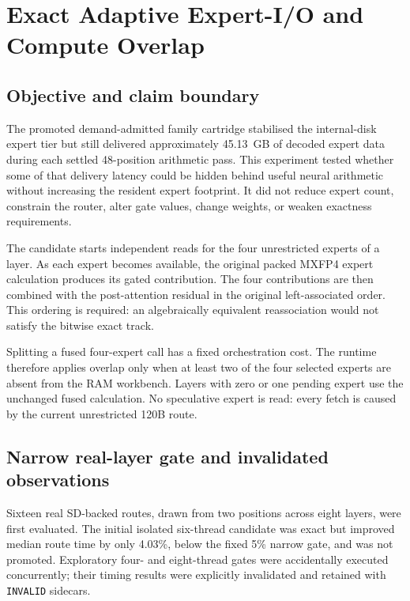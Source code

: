 
\section{Exact Adaptive Expert-I/O and Compute Overlap}
\label{sec:gptoss120b-exact-io-compute-overlap}

\subsection{Objective and claim boundary}

The promoted demand-admitted family cartridge stabilised the internal-disk
expert tier but still delivered approximately 45.13~GB of decoded expert data
during each settled 48-position arithmetic pass.  This experiment tested
whether some of that delivery latency could be hidden behind useful neural
arithmetic without increasing the resident expert footprint.  It did not
reduce expert count, constrain the router, alter gate values, change weights,
or weaken exactness requirements.

The candidate starts independent reads for the four unrestricted experts of a
layer.  As each expert becomes available, the original packed MXFP4 expert
calculation produces its gated contribution.  The four contributions are then
combined with the post-attention residual in the original left-associated
order.  This ordering is required: an algebraically equivalent reassociation
would not satisfy the bitwise exact track.

Splitting a fused four-expert call has a fixed orchestration cost.  The runtime
therefore applies overlap only when at least two of the four selected experts
are absent from the RAM workbench.  Layers with zero or one pending expert use
the unchanged fused calculation.  No speculative expert is read: every fetch
is caused by the current unrestricted 120B route.

\subsection{Narrow real-layer gate and invalidated observations}

Sixteen real SD-backed routes, drawn from two positions across eight layers,
were first evaluated.  The initial isolated six-thread candidate was exact but
improved median route time by only 4.03\%, below the fixed 5\% narrow gate, and
was not promoted.  Exploratory four- and eight-thread gates were accidentally
executed concurrently; their timing results were explicitly invalidated and
retained with \texttt{INVALID} sidecars.

